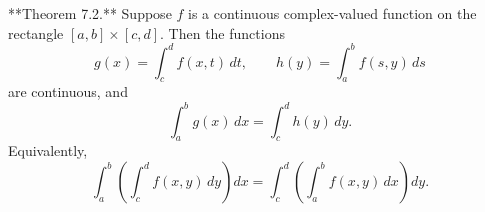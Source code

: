 **Theorem 7.2.** Suppose $f$ is a continuous complex-valued function on the rectangle $[a, b] \times [c, d]$. Then the functions
$$
g(x) = \int_c^d f(x, t) \, dt, \qquad h(y) = \int_a^b f(s, y) \, ds
$$
are continuous, and
$$
\int_a^b g(x) \, dx = \int_c^d h(y) \, dy.
$$
Equivalently,
$$
\int_a^b \left( \int_c^d f(x, y) \, dy \right) dx = \int_c^d \left( \int_a^b f(x, y) \, dx \right) dy.
$$
